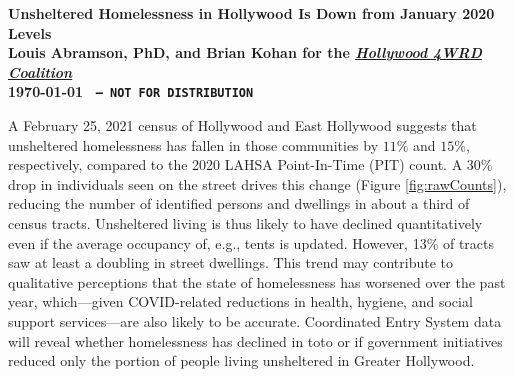 \documentclass[11pt]{article}
\def\bfr{\bf\color{red}}
\def\bfp{\color{magenta}}
\def\resp{respectively}
\begin{document}

\begin{center}
	\Large\bf Unsheltered Homelessness in Hollywood Is Down from January 2020 Levels\\
	\vspace{1ex}
	{\normalsize\rm Louis Abramson, PhD, and Brian Kohan 
	for the \href{http://www.hollywood4wrd.live}{\it Hollywood 4WRD Coalition} \\ \today 
	{\bfr \texttt{ -- NOT FOR DISTRIBUTION}}}
\end{center}

 A February 25, 2021 census of Hollywood and East Hollywood suggests that 
unsheltered homelessness has fallen in those communities by $11\%$ and $15\%$, \resp, compared to 
the 2020 LAHSA Point-In-Time (PIT) count. A 30\% drop in individuals seen on the street drives this 
change (Figure \ref{fig:rawCounts}), reducing the number of identified persons and dwellings in 
about a third of census tracts. Unsheltered living is thus likely to have declined quantitatively even if the 
average occupancy of, e.g., tents is updated. {\bfp However, 13\% of tracts
saw at least a doubling in street dwellings. This trend may contribute to qualitative perceptions that the 
state of homelessness has worsened over the past year, which---given COVID-related reductions in 
health, hygiene, and social support services---are also likely to be accurate.} Coordinated Entry System data will 
reveal whether homelessness has declined in toto or if government initiatives reduced only the portion of 
people living unsheltered in Greater Hollywood.
\end{document}
